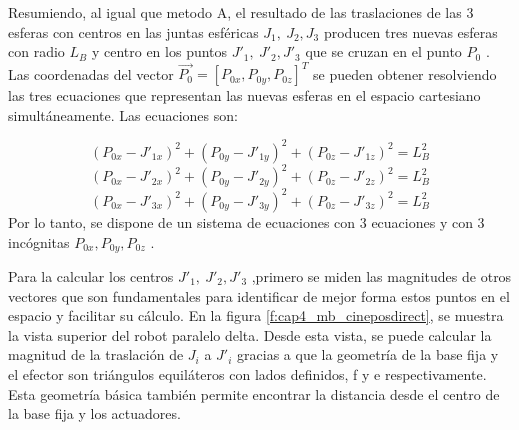     \newpage


        
    Resumiendo, al igual que metodo A, el resultado de las traslaciones de las 3 esferas con centros en las juntas esféricas  \( J_{1},~J_{2},J_{3} \)  producen tres nuevas esferas con radio  \( L_{B} \)  y centro en los puntos  \( J'_{1},~J'_{2},J'_{3} \)   que se cruzan en el punto  \( P_{0} \) . Las coordenadas del vector  \( \overrightarrow{P_{0}}=  \left[ P_{0x},P_{0y},P_{0z} \right] ^{T} \)  se pueden obtener resolviendo las tres ecuaciones que representan las nuevas esferas en el espacio cartesiano simultáneamente. Las ecuaciones son:
    
        \begin{equation}
            \left( P_{0x}-J'_{1x} \right) ^{2}+ \left( P_{0y}-J'_{1y} \right) ^{2}+ \left( P_{0z}-J'_{1z} \right) ^{2}=L_{B}^{2}
        \label{eq:cap4_MB_21}
        \end{equation}
        \begin{equation}
            \left( P_{0x}-J'_{2x} \right) ^{2}+ \left( P_{0y}-J'_{2y} \right) ^{2}+ \left( P_{0z}-J'_{2z} \right) ^{2}=L_{B}^{2}
        \label{eq:cap4_MB_22}
        \end{equation}    
        \begin{equation}
            \left( P_{0x}-J'_{3x} \right) ^{2}+ \left( P_{0y}-J'_{3y} \right) ^{2}+ \left( P_{0z}-J'_{3z} \right) ^{2}=L_{B}^{2}
        \label{eq:cap4_MB_23}
        \end{equation}            
    Por lo tanto, se dispone de un sistema de ecuaciones con 3 ecuaciones y con 3 incógnitas \( P_{0x},P_{0y},P_{0z} \) .  
    
    Para la calcular los centros \( J'_{1},~J'_{2},J'_{3} \) ,primero se miden las magnitudes de otros vectores que son fundamentales para identificar de mejor forma estos puntos en el espacio y facilitar su cálculo. En la figura \ref{f:cap4_mb_cineposdirect}, se muestra la vista superior del robot paralelo delta. Desde esta vista, se puede calcular la magnitud de la traslación de  $J_i$ a  $J'_i$  gracias a que la geometría de la base fija y el efector son triángulos equiláteros con lados definidos, f y e respectivamente. Esta geometría básica también permite encontrar la distancia desde el centro de la base fija y los actuadores.
    
